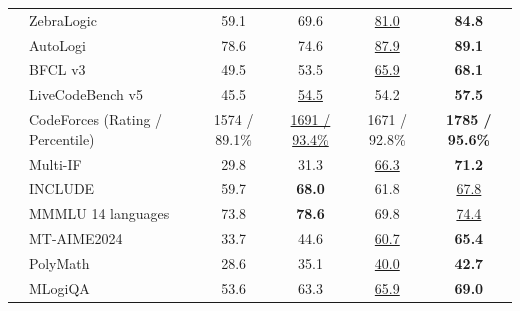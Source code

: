 \begin{table}[tbp]
{\begin{tabular}{@{}clcccc@{}}
& ZebraLogic & 59.1 & 69.6 & \underline{81.0} & \textbf{84.8} \\
& AutoLogi & 78.6 & 74.6 & \underline{87.9} & \textbf{89.1} \\
\midrule
{} & BFCL v3 & 49.5 & 53.5 & \underline{65.9} & \textbf{68.1} \\
& LiveCodeBench v5 & 45.5 & \underline{54.5} & 54.2 & \textbf{57.5} \\
& CodeForces {\tiny{(Rating / Percentile)}} & 1574 / 89.1\% & \underline{1691 / 93.4\%} & 1671 / 92.8\% & \textbf{1785 / 95.6\%} \\
\midrule
{} & Multi-IF & 29.8 & 31.3 & \underline{66.3} & \textbf{71.2} \\
& INCLUDE & 59.7 & \textbf{68.0} & 61.8 & \underline{67.8} \\
& MMMLU {\tiny{14 languages}} & 73.8 & \textbf{78.6} & 69.8 & \underline{74.4} \\
& MT-AIME2024 & 33.7 & 44.6 & \underline{60.7} & \textbf{65.4} \\
& PolyMath & 28.6 & 35.1 & \underline{40.0} & \textbf{42.7} \\
& MLogiQA & 53.6 & 63.3 & \underline{65.9} & \textbf{69.0} \\
\bottomrule
\end{tabular}
}
\vspace{1mm}
\end{table}

